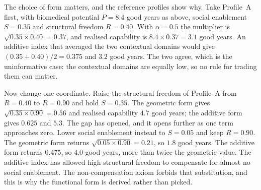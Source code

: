 The choice of form matters, and the reference profiles show why. Take
Profile~A first, with biomedical potential $P=8.4$ good years as above, social
enablement $S=0.35$ and structural freedom $R=0.40$. With $\alpha=0.5$ the
multiplier is $\sqrt{0.35\times0.40}=0.37$, and realised capability is
$8.4\times0.37=3.1$ good years. An additive index that averaged the two
contextual domains would give $(0.35+0.40)/2=0.375$ and $3.2$ good years. The
two agree, which is the uninformative case: the contextual domains are equally
low, so no rule for trading them can matter.

Now change one coordinate. Raise the structural freedom of Profile~A from
$R=0.40$ to $R=0.90$ and hold $S=0.35$. The geometric form gives
$\sqrt{0.35\times0.90}=0.56$ and realised capability $4.7$ good years; the
additive form gives $0.625$ and $5.3$. The gap has opened, and it opens further
as one term approaches zero. Lower social enablement instead to $S=0.05$ and
keep $R=0.90$. The geometric form returns $\sqrt{0.05\times0.90}=0.21$, so
$1.8$ good years. The additive form returns $0.475$, so $4.0$ good years, more
than twice the geometric value. The additive index has allowed high structural
freedom to compensate for almost no social enablement. The non-compensation
axiom forbids that substitution, and this is why the functional form is
derived rather than picked.


